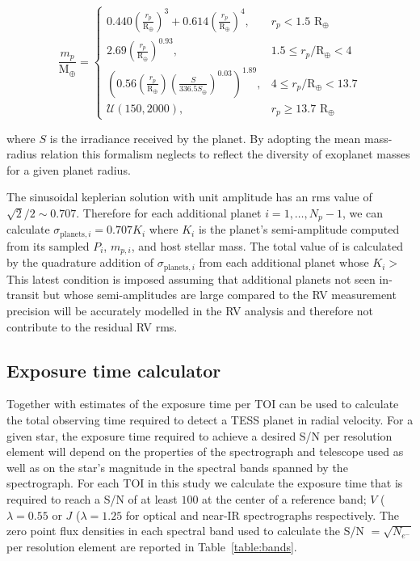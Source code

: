 \begin{equation}
  \frac{m_p}{\text{M}_{\oplus}} = 
  \begin{cases}
    0.440 \left(\frac{r_p}{\text{R}_{\oplus}} \right)^3 + 0.614 \left( \frac{r_p}{\text{R}_{\oplus}} \right)^4, & r_p < 1.5 \text{ R}_{\oplus} \\
    2.69 \left( \frac{r_p}{\text{R}_{\oplus}} \right)^{0.93}, & 1.5 \leq r_p/\text{R}_{\oplus} < 4 \\
    \left( 0.56 \left( \frac{r_p}{\text{R}_{\oplus}} \right) \left( \frac{S}{336.5 S_{\oplus}} \right)^{0.03} \right)^{1.89}, & 4 \leq r_p/\text{R}_{\oplus} < 13.7 \\  
    \mathcal{U}(150,2000), & r_p \geq 13.7 \text{ R}_{\oplus}
  \end{cases}
  \label{eq:MR}
\end{equation}

\noindent where $S$ is the irradiance received by the planet. By adopting the mean mass-radius relation this
formalism neglects to reflect the diversity of exoplanet masses for a given planet radius.  

The sinusoidal keplerian solution with unit amplitude has an rms value of $\sqrt{2}/2 \sim 0.707$.
Therefore for each additional planet $i=1,\dots,N_p-1$,
we can calculate $\sigma_{\text{planets},i}=0.707K_i$ where $K_i$ is the planet's semi-amplitude computed
from its sampled $P_i$, $m_{p,i}$, and host stellar mass.
The total value of \sigplan{}
is calculated by the quadrature addition of $\sigma_{\text{planets},i}$ from each additional planet whose
$K_i >$  This latest condition is imposed assuming that additional planets not seen in-transit
but whose semi-amplitudes are large compared to the RV measurement precision will be accurately
modelled in the RV analysis and therefore not contribute to the residual RV rms.

\subsection{Exposure time calculator} \label{sect:etc}
Together with estimates of \nrv{,}
the exposure time \texp{} per TOI can be used to calculate the total observing
time required to detect a TESS planet in radial velocity. For a given star, the exposure time required to
achieve a desired S/N per resolution element will depend on the properties of the spectrograph and telescope
used as well as on the star's magnitude in the spectral bands spanned by the spectrograph.
For each TOI in this study we calculate the exposure time that is required to reach a S/N of at least $100$
at the center of a reference band; $V$ ($\lambda=0.55$ \micron{)} or $J$ ($\lambda=1.25$ \micron{)} for optical
and near-IR spectrographs respectively. The zero point flux densities in each spectral band used to
calculate the S/N $=\sqrt{N_{e^-}}$ per resolution element are reported in Table~\ref{table:bands}.


